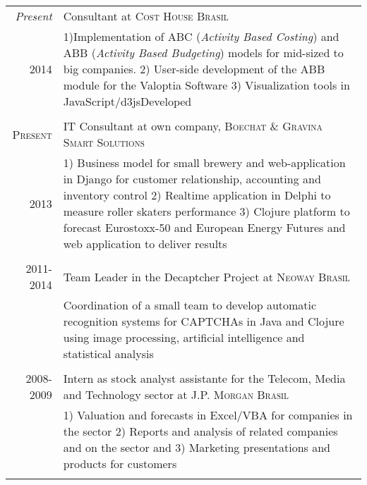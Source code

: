 \documentclass[a4paper,10pt]{article} %
\begin{document}
\begin{tabular}{r|p{11cm}}
\emph{Present} & Consultant at \textsc{Cost House Brasil} \\
\textsc{2014} & \footnotesize{1)Implementation of ABC (\textit{Activity Based
  Costing}) and ABB (\textit{Activity Based Budgeting}) models for mid-sized to
  big companies. 2) User-side development of the ABB module for the
  Valoptia Software 3) Visualization tools in JavaScript/d3jsDeveloped }\\
\multicolumn{2}{c}{} \\


\textsc{Present} & IT Consultant at own company, \textsc{Boechat \&
  Gravina Smart Solutions} \\
\textsc{2013} & \footnotesize{1) Business model for small brewery
  and web-application in Django for customer relationship, accounting
  and inventory control 2) Realtime application in Delphi to measure
  roller skaters performance 3) Clojure platform to forecast
  Eurostoxx-50 and European Energy Futures and web application to
  deliver results }
\\
\multicolumn{2}{c}{} \\


\textsc{2011-2014} & Team Leader in the Decaptcher Project at \textsc{Neoway
Brasil} \\
& \footnotesize{Coordination of a small team to develop automatic
  recognition systems for CAPTCHAs in Java and Clojure using image
  processing, artificial intelligence and statistical analysis} \\
\multicolumn{2}{c}{} \\


\textsc{2008-2009} & Intern as stock analyst assistante for the
Telecom, Media and Technology sector at \textsc{J.P. Morgan Brasil} \\
& \footnotesize{1) Valuation and forecasts in Excel/VBA for companies in
  the sector 2) Reports and analysis of related companies and on the
  sector and 3) Marketing presentations and products for customers}\\
\multicolumn{2}{c}{} \\



\end{tabular}
\end{document}
